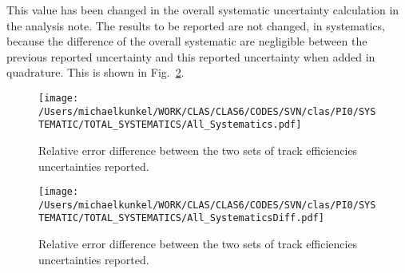 \documentclass[10pt,a4paper]{report}
\newlength{\figwidth}
\newlength{\hfigheight}
\begin{document}
\FloatBarrier
This value has been changed in the overall systematic uncertainty calculation in the analysis note. The results to be reported are not changed, in systematics, because the difference of the overall systematic are negligible between the previous reported uncertainty and this reported uncertainty when added in quadrature. This is shown in Fig.~\ref{fig:toteff_DIFF}.

\begin{figure}[h!]\begin{center}
		\texttt{[image: /Users/michaelkunkel/WORK/CLAS/CLAS6/CODES/SVN/clas/PI0/SYSTEMATIC/TOTAL\_SYSTEMATICS/All\_Systematics.pdf]}
		\caption{Relative error difference between the two sets of track efficiencies uncertainties reported.}\label{fig:toteff_sys}
	\end{center}\end{figure}
	
	
\begin{figure}[h!]\begin{center}
		\texttt{[image: /Users/michaelkunkel/WORK/CLAS/CLAS6/CODES/SVN/clas/PI0/SYSTEMATIC/TOTAL\_SYSTEMATICS/All\_SystematicsDiff.pdf]}
		\caption{Relative error difference between the two sets of track efficiencies uncertainties reported.}\label{fig:toteff_DIFF}
\end{center}\end{figure}
\end{document}
